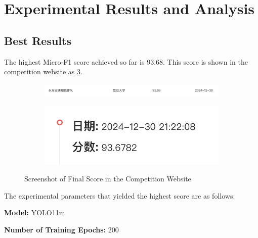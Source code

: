 \section{Experimental Results and Analysis}
\label{sec:result}

\subsection{Best Results}

\noindent
The highest Micro-F1 score achieved so far is 93.68. This score is shown in the competition website as \cref{fig:final-score}.

\begin{figure}
    \centering
    \begin{subfigure}{0.75\linewidth}
        \includegraphics[width=\linewidth]{./graphs/图片14.png}
        \label{fig:final-score1}
    \end{subfigure}
    \begin{subfigure}{0.2\linewidth}
        \includegraphics[width=\linewidth]{./graphs/图片15.png}
        \label{fig:final-score2}
    \end{subfigure}
    \caption{Screenshot of Final Score in the Competition Website}
    \label{fig:final-score}
\end{figure}

\noindent
The experimental parameters that yielded the highest score are as follows:

\noindent
\textbf{Model:} YOLO11m

\noindent
\textbf{Number of Training Epochs:} 200

